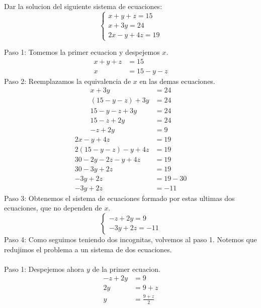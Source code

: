 \documentclass{article}
\begin{document}
\begin{ejemplo}
Dar la solucion del siguiente sistema de ecuaciones:
	\begin{equation}
		\begin{cases}
		x+y+z=15\\
		x+3y=24\nonumber\\
		2x-y+4z=19
		\end{cases}
	\end{equation}
\begin{normalsize}
Paso 1: Tomemos la primer ecuacion y despejemos $x$.
\begin{align}
	x+y+z&=15\nonumber\\
	x&=15-y-z\nonumber
\end{align}
Paso 2: Reemplazamos la equivalencia de $x$ en las demas ecuaciones.
\begin{align}
	x+3y&=24\nonumber\\
	(15-y-z)+3y&=24\nonumber\\
	15-y-z+3y&=24\nonumber\\
	15-z+2y&=24\nonumber\\
	-z+2y&=9\nonumber
\end{align}
\begin{align}
	2x-y+4z&=19\nonumber\\
	2(15-y-z)-y+4z&=19\nonumber\\
	30-2y-2z-y+4z&=19\nonumber\\
	30-3y+2z&=19\nonumber\\
	-3y+2z&=19-30\nonumber\\
	-3y+2z&=-11\nonumber
\end{align}
Paso 3: Obtenemos el sistema de ecuaciones formado por estas ultimas dos ecuaciones, que no dependen de $x$.
	\begin{equation}
		\begin{cases}
		-z+2y=9\nonumber\\
		-3y+2z=-11
		\end{cases}
	\end{equation}
Paso 4: Como seguimos teniendo dos incognitas, volvemos al paso 1. Notemos que redujimos el problema a un sistema de dos ecuaciones.\\\\
Paso 1: Despejemos ahora $y$ de la primer ecuacion.
\begin{align}
	-z+2y&=9\nonumber\\
	2y&=9+z\nonumber\\
	y&=\frac{9+z}{2}\nonumber
\end{align}

\end{normalsize}
\end{ejemplo}
\end{document}
